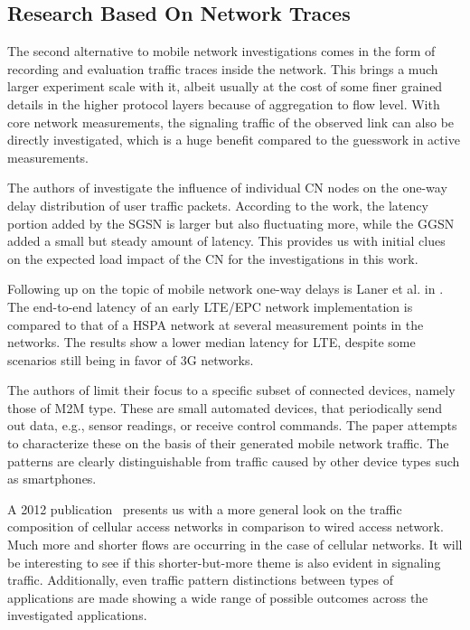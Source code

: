 \subsection{Research Based On Network Traces}

The second alternative to mobile network investigations comes in the form of recording and evaluation traffic traces inside the network. This brings a much larger experiment scale with it, albeit usually at the cost of some finer grained details in the higher protocol layers because of aggregation to flow level. With core network measurements, the signaling traffic of the observed link can also be directly investigated, which is a huge benefit compared to the guesswork in active measurements.

The authors of \cite{4675847} investigate the influence of individual \gls{CN} nodes on the one-way delay distribution of user traffic packets. According to the work, the latency portion added by the \gls{SGSN} is larger but also fluctuating more, while the \gls{GGSN} added a small but steady amount of latency. This provides us with initial clues on the expected load impact of the \gls{CN} for the investigations in this work.

Following up on the topic of mobile network one-way delays is Laner et al. in \cite{laner2012delaycomparison}. The end-to-end latency of an early \gls{LTE}/\gls{EPC} network implementation is compared to that of a \gls{HSPA} network at several measurement points in the networks. The results show a lower median latency for \gls{LTE}, despite some scenarios still being in favor of \gls{3G} networks.

The authors of \cite{Shafiq:2012:FLC:2254756.2254767} limit their focus to a specific subset of connected devices, namely those of \gls{M2M} type. These are small automated devices, that periodically send out data, e.g., sensor readings, or receive control commands. The paper attempts to characterize these on the basis of their generated mobile network traffic. The patterns are clearly distinguishable from traffic caused by other device types such as smartphones.

A 2012 publication~\cite{Zhang:2012:UCC:2377677.2377764} presents us with a more general look on the traffic composition of cellular access networks in comparison to wired access network. Much more and shorter flows are occurring in the case of cellular networks. It will be interesting to see if this shorter-but-more theme is also evident in signaling traffic. Additionally, even traffic pattern distinctions between types of applications are made showing a wide range of possible outcomes across the investigated applications.


